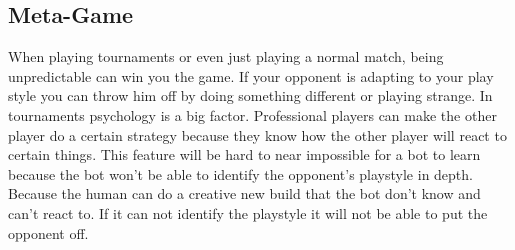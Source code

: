 \subsection{Meta-Game}		
		When playing tournaments or even just playing a normal match, being unpredictable can win you the game. 
		If your opponent is adapting to your play style you can throw him off by doing something different or playing strange.
		In tournaments psychology is a big factor. Professional players can make the other player do a certain strategy because they know 
		how the other player will react to certain things. This feature will be hard to near impossible for a bot to learn because the bot won't be able to 
		identify the opponent's playstyle in depth. Because the human can do a creative new build that the bot don't know and can't react to. 
		If it can not identify the playstyle it will not be able to put the opponent off.

